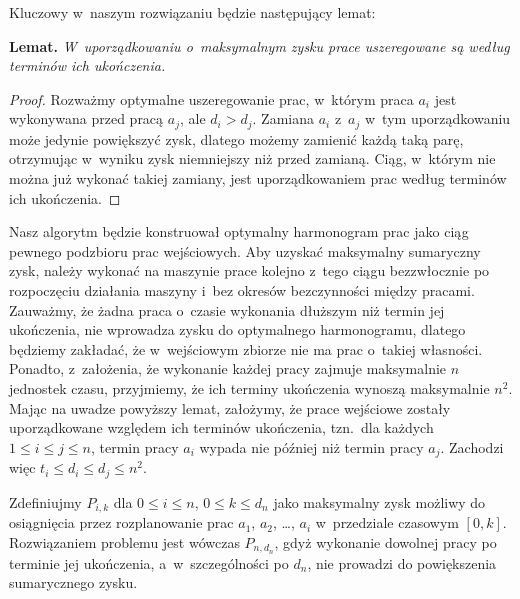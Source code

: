 Kluczowy w~naszym rozwiązaniu będzie następujący lemat:

\medskip
\noindent\textsf{\textbf{Lemat.}} \textit{W~uporządkowaniu o~maksymalnym zysku prace uszeregowane są według terminów ich ukończenia.}
\begin{proof}
Rozważmy optymalne uszeregowanie prac, w~którym praca $a_i$ jest wykonywana przed pracą $a_j$, ale $d_i>d_j$.
Zamiana $a_i$ z~$a_j$ w~tym uporządkowaniu może jedynie powiększyć zysk, dlatego możemy zamienić każdą taką parę, otrzymując w~wyniku zysk niemniejszy niż przed zamianą.
Ciąg, w~którym nie można już wykonać takiej zamiany, jest uporządkowaniem prac według terminów ich ukończenia.
\end{proof}

Nasz algorytm będzie konstruował optymalny harmonogram prac jako ciąg pewnego podzbioru prac wejściowych.
Aby uzyskać maksymalny sumaryczny zysk, należy wykonać na maszynie prace kolejno z~tego ciągu bezzwłocznie po rozpoczęciu działania maszyny i~bez okresów bezczynności między pracami.
Zauważmy, że żadna praca o~czasie wykonania dłuższym niż termin jej ukończenia, nie wprowadza zysku do optymalnego harmonogramu, dlatego będziemy zakładać, że w~wejściowym zbiorze nie ma prac o~takiej własności.
Ponadto, z~założenia, że wykonanie każdej pracy zajmuje maksymalnie $n$ jednostek czasu, przyjmiemy, że ich terminy ukończenia wynoszą maksymalnie $n^2$.
Mając na uwadze powyższy lemat, założymy, że prace wejściowe zostały uporządkowane względem ich terminów ukończenia, tzn.\ dla każdych $1\le i\le j\le n$, termin pracy $a_i$ wypada nie później niż termin pracy $a_j$.
Zachodzi więc $t_i\le d_i\le d_j\le n^2$.

Zdefiniujmy $P_{i,k}$ dla $0\le i\le n$, $0\le k\le d_n$ jako maksymalny zysk możliwy do osiągnięcia przez rozplanowanie prac $a_1$, $a_2$, \dots, $a_i$ w~przedziale czasowym $[0,k]$.
Rozwiązaniem problemu jest wówczas $P_{n,d_n}$\!, gdyż wykonanie dowolnej pracy po terminie jej ukończenia, a~w~szczególności po $d_n$, nie prowadzi do powiększenia sumarycznego zysku.

